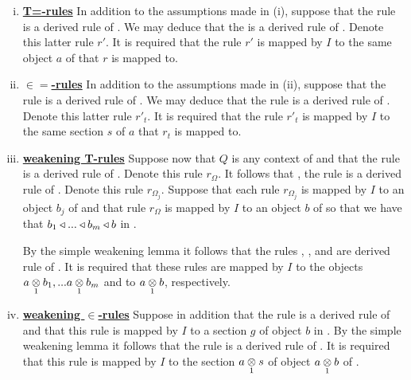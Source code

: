\begin{enumerate}[(i)]
\item \underline{\textbf{T=-rules}} 
In addition to the assumptions made in (i), suppose that  
the rule  is a derived rule of \gatU. 
We may deduce that the
 is a derived rule of \gatU. Denote this latter rule $r'$.
It is required that the rule $r'$ is mapped by $I$ to the same object $a$ of \catcw that $r$ is mapped to.

\item \underline{\textbf{$\boldsymbol{\in=}$-rules}} 
In addition to the assumptions made in (ii),  suppose that the rule
is a derived rule of \gatU. We may deduce that the rule
 is a  derived rule of \gatU. 
Denote this latter rule $r'_t$.
It is required that the rule $r'_t$ is mapped by $I$ to the same section $s$ of $a$ that $r_t$ is mapped to.

\item \underline{\textbf{weakening T-rules}} 
Suppose now that $Q$ is any context of \gatUw and that the rule 
 is a derived rule of \gatU. Denote this rule $r_\Omega$. 
It follows that \foreachj, the rule    is a derived rule of \gatU. Denote this rule $r_{\Omega_j}$.
Suppose that each rule $r_{\Omega_j}$ is mapped by $I$ to an object $b_j$ of \catcw and that rule $r_\Omega$ is mapped by $I$ to an object $b$ of \catcw so that
we have that $b_1 \base ... \base b_m \base b$ in \catc.

By the simple weakening lemma it follows that the rules
, \foreachj, and 
 are  derived rule of \gatU. It is required that these rules are mapped by $I$ to the objects
$\crossx{a}{b_1}{1},...\crossx{a}{b_m}{1}$ and to $\crossx{a}{b}{1}$, respectively. 

\item \underline{\textbf{weakening $\boldsymbol {\in}$-rules}} 
Suppose in addition that the rule  is a derived rule of \gatUw 
and that this rule is mapped by $I$ to a section $g$ of object $b$ in \catc.
By the simple weakening lemma it follows that the rule 
is a derived rule of \gatU. It is required that this rule is mapped by $I$ to the section $\crossx{a}{s}{1}$
of object $\crossx{a}{b}{1}$ of \catc.



\end{enumerate}
